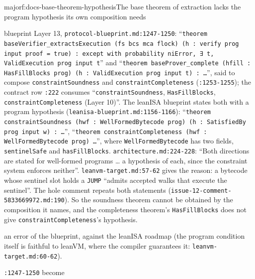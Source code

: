\begin{finding}{major}{f:docs-base-theorem-hypothesis}{The base theorem of extraction lacks the program hypothesis its own composition needs}
\begin{sloppypar}
blueprint Layer 13, \texttt{protocol-\allowbreak{}blueprint.\allowbreak{}md:\allowbreak{}1247-\allowbreak{}1250}: ``\texttt{theorem base\allowbreak{}Verifier\_\allowbreak{}extracts\allowbreak{}Execution (\allowbreak{}fs bcs mca flock) (\allowbreak{}h :\allowbreak{} verify prog input proof = true) :\allowbreak{} except with probability ni\allowbreak{}Error,\allowbreak{} ∃ t,\allowbreak{} Valid\allowbreak{}Execution prog input t}'' and ``\texttt{theorem base\allowbreak{}Prover\_\allowbreak{}complete (\allowbreak{}hfill :\allowbreak{} Has\allowbreak{}Fill\allowbreak{}Blocks prog) (\allowbreak{}h :\allowbreak{} Valid\allowbreak{}Execution prog input t) :\allowbreak{} …}'', said to compose \texttt{constraint\allowbreak{}Soundness} and \texttt{constraint\allowbreak{}Completeness} (\texttt{:\allowbreak{}1253-\allowbreak{}1255}); the contract row \texttt{:\allowbreak{}222} consumes ``\texttt{constraint\allowbreak{}Soundness}, \texttt{HasFillBlocks}, \texttt{constraint\allowbreak{}Completeness} (Layer 10)''. The leanISA blueprint states both with a program hypothesis (\texttt{leanisa-\allowbreak{}blueprint.\allowbreak{}md:\allowbreak{}1156-\allowbreak{}1166}): ``\texttt{theorem constraint\allowbreak{}Soundness (\allowbreak{}hwf :\allowbreak{} Well\allowbreak{}Formed\allowbreak{}Bytecode prog) (\allowbreak{}h :\allowbreak{} Satisfied\allowbreak{}By prog input w) :\allowbreak{} …}'', ``\texttt{theorem constraint\allowbreak{}Completeness (\allowbreak{}hwf :\allowbreak{} Well\allowbreak{}Formed\allowbreak{}Bytecode prog) …}'', where \texttt{Well\allowbreak{}Formed\allowbreak{}Bytecode} has two fields, \texttt{sentinelSafe} and \texttt{hasFillBlocks}. \texttt{architecture.\allowbreak{}md:\allowbreak{}224-\allowbreak{}228}: ``Both directions are stated for well-formed programs … a hypothesis of each, since the constraint system enforces neither''. \texttt{leanvm-\allowbreak{}target.\allowbreak{}md:\allowbreak{}57-\allowbreak{}62} gives the reason: a bytecode whose sentinel slot holds a \texttt{JUMP} ``admits accepted walks that execute the sentinel''. The hole comment repeats both statements (\texttt{issue-\allowbreak{}12-\allowbreak{}comment-\allowbreak{}5833669972.\allowbreak{}md:\allowbreak{}190}). So the soundness theorem cannot be obtained by the composition it names, and the completeness theorem's \texttt{HasFillBlocks} does not give \texttt{constraint\allowbreak{}Completeness}'s hypothesis.
\end{sloppypar}
 \begin{sloppypar}
an error of the blueprint, against the leanISA roadmap (the program condition itself is faithful to leanVM, where the compiler guarantees it: \texttt{leanvm-\allowbreak{}target.\allowbreak{}md:\allowbreak{}60-\allowbreak{}62}).
\end{sloppypar}
 \texttt{:\allowbreak{}1247-\allowbreak{}1250} become


\end{finding}

